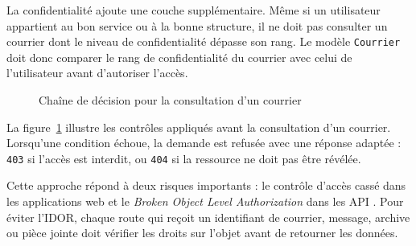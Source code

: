 La confidentialité ajoute une couche supplémentaire. Même si un utilisateur appartient au bon service ou à la bonne structure, il ne doit pas consulter un courrier dont le niveau de confidentialité dépasse son rang. Le modèle \texttt{Courrier} doit donc comparer le rang de confidentialité du courrier avec celui de l'utilisateur avant d'autoriser l'accès.

\begin{figure}[H]
\centering
{}
\caption{Chaîne de décision pour la consultation d'un courrier}
\label{fig:decision-acces}
\end{figure}

La figure~\ref{fig:decision-acces} illustre les contrôles appliqués avant la consultation d'un courrier. Lorsqu'une condition échoue, la demande est refusée avec une réponse adaptée : \texttt{403} si l'accès est interdit, ou \texttt{404} si la ressource ne doit pas être révélée.

Cette approche répond à deux risques importants : le contrôle d'accès cassé dans les applications web et le \textit{Broken Object Level Authorization} dans les API \cite{owasp-api}. Pour éviter l'IDOR, chaque route qui reçoit un identifiant de courrier, message, archive ou pièce jointe doit vérifier les droits sur l'objet avant de retourner les données.

